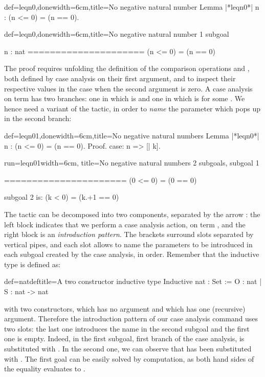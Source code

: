 \begin{coq}{def=leqn0,done}{width=6cm,title=No negative natural number}
Lemma |*leqn0*| n : (n <= 0) = (n == 0).
\end{coq}
\begin{coqout}{def=leqn0,done}{width=6cm,title=No negative natural
    number}
1 subgoal

n : nat
=====================
  (n <= 0) = (n == 0)
\end{coqout}

The proof requires unfolding the definition of the comparison operations
\C{<=} and \C{==}, both defined by case analysis on their first
argument, and to inspect their respective values in the case when the
second argument is zero. A case analysis on term  has two
branches: one in which  is  and one in which  is
 for some . We hence need a variant of the 
tactic, in order to \emph{name} the parameter  which pops up in
the second branch:
\begin{coq}{def=leqn01,done}{width=6cm,title=No negative natural numbers}
Lemma |*leqn0*| n : (n <= 0) = (n == 0).
Proof.
case: n => [| k].
\end{coq}
\begin{coqout}{run=leqn01}{width=6cm, title=No negative natural numbers}
2 subgoals, subgoal 1

======================
  (0 <= 0) = (0 == 0)

subgoal 2 is:
 (k < 0) = (k.+1 == 0)
\end{coqout}
The tactic   can be decomposed into two components,
separated by the arrow \C{=>}: the left block  indicates
that we  perform a case analysis action, on term , and the right
block \C{[|k]} is an \emph{introduction pattern}. The brackets
surround slots separated by vertical pipes, and each slot allows to
name the parameters to be introduced in each subgoal created by the
case analysis, in order. Remember that the inductive type  is
defined as:

\begin{coq}{def=natdef}{title=A two constructor inductive type}
Inductive nat : Set :=  O : nat | S : nat -> nat
\end{coq}
with two constructors,  which has no argument and  which has
one (recursive) argument. Therefore the introduction pattern \C{[|k]}
of our case analysis command uses two slots: the last one introduces
the name  in the second subgoal and the first one is
empty. Indeed, in the first subgoal, first branch of the case
analysis,  is substituted with . In the second one, we can
observe that  has been substituted with . The first goal
can be easily solved by computation, as both hand sides of the equality
evaluates to .

